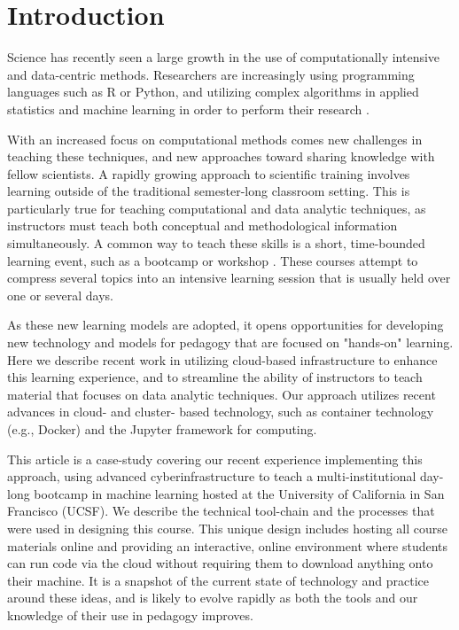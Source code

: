 \section{Introduction}

Science has recently seen a large growth in the use of
computationally intensive and data-centric methods. Researchers are
increasingly using programming languages such as R or Python, and utilizing
complex algorithms in applied statistics and machine learning in order to
perform their research \cite{momcheva2015astro}.

With an increased focus on computational methods
comes new challenges in teaching these techniques, and new approaches
toward sharing knowledge with fellow scientists.
A rapidly growing approach to scientific training involves learning
outside of the traditional semester-long classroom setting.
This is particularly true
for teaching computational and data analytic techniques,
as instructors must teach both conceptual and methodological information
simultaneously. A common way to teach these skills is a short,
time-bounded learning event, such as a bootcamp or workshop
\cite{wilson2016software}. These  courses attempt to compress several
topics into an intensive learning session that is usually held over one or
several days.

As these new learning models are adopted, it opens
opportunities for developing new technology and models for pedagogy that are
focused on "hands-on" learning. Here we describe
recent work in utilizing cloud-based infrastructure to enhance this learning
experience, and to streamline the ability of instructors to
teach material that focuses on data analytic techniques. Our approach
utilizes recent advances in cloud- and cluster- based technology, such
as container technology (e.g., Docker) and the
Jupyter framework for computing. 

This article is a case-study covering our recent experience implementing this approach, using
advanced cyberinfrastructure to teach a multi-institutional day-long bootcamp in machine learning
hosted at the University of California in San Francisco (UCSF).
We describe the technical tool-chain and the processes that were used in
designing this course. This
unique design includes hosting all course materials online and providing
an interactive, online environment where students can run code via the cloud
without requiring them to download anything onto their machine.
It is a snapshot of the current state
of technology and practice around these ideas, and is likely to evolve rapidly
as both the tools and our knowledge of their use in pedagogy improves.

